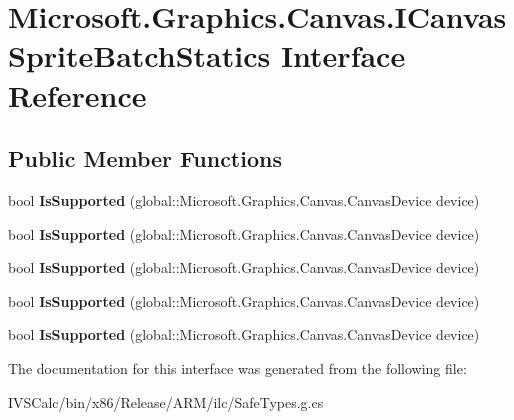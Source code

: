 \hypertarget{interface_microsoft_1_1_graphics_1_1_canvas_1_1_i_canvas_sprite_batch_statics}{}\section{Microsoft.\+Graphics.\+Canvas.\+I\+Canvas\+Sprite\+Batch\+Statics Interface Reference}
\label{interface_microsoft_1_1_graphics_1_1_canvas_1_1_i_canvas_sprite_batch_statics}
\subsection*{Public Member Functions}
\begin{DoxyCompactItemize}
\item 
\mbox{\label{interface_microsoft_1_1_graphics_1_1_canvas_1_1_i_canvas_sprite_batch_statics_a821686b536b152efb4fba9c33372497a}} 
bool {\bfseries Is\+Supported} (global\+::\+Microsoft.\+Graphics.\+Canvas.\+Canvas\+Device device)
\item 
\mbox{\label{interface_microsoft_1_1_graphics_1_1_canvas_1_1_i_canvas_sprite_batch_statics_a821686b536b152efb4fba9c33372497a}} 
bool {\bfseries Is\+Supported} (global\+::\+Microsoft.\+Graphics.\+Canvas.\+Canvas\+Device device)
\item 
\mbox{\label{interface_microsoft_1_1_graphics_1_1_canvas_1_1_i_canvas_sprite_batch_statics_a821686b536b152efb4fba9c33372497a}} 
bool {\bfseries Is\+Supported} (global\+::\+Microsoft.\+Graphics.\+Canvas.\+Canvas\+Device device)
\item 
\mbox{\label{interface_microsoft_1_1_graphics_1_1_canvas_1_1_i_canvas_sprite_batch_statics_a821686b536b152efb4fba9c33372497a}} 
bool {\bfseries Is\+Supported} (global\+::\+Microsoft.\+Graphics.\+Canvas.\+Canvas\+Device device)
\item 
\mbox{\label{interface_microsoft_1_1_graphics_1_1_canvas_1_1_i_canvas_sprite_batch_statics_a821686b536b152efb4fba9c33372497a}} 
bool {\bfseries Is\+Supported} (global\+::\+Microsoft.\+Graphics.\+Canvas.\+Canvas\+Device device)
\end{DoxyCompactItemize}


The documentation for this interface was generated from the following file\+:\begin{DoxyCompactItemize}
\item 
I\+V\+S\+Calc/bin/x86/\+Release/\+A\+R\+M/ilc/Safe\+Types.\+g.\+cs\end{DoxyCompactItemize}
